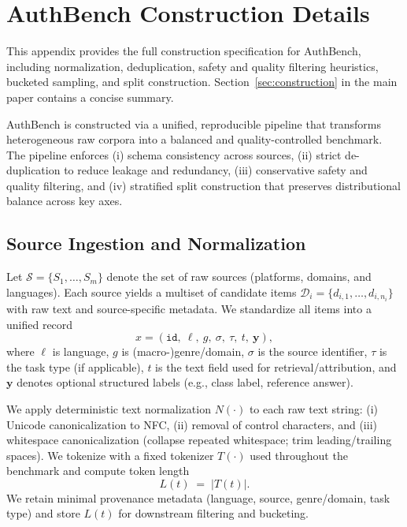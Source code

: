 \documentclass[11pt]{article}
\begin{document}


\appendix

\section{AuthBench Construction Details}
\label{sec:appendix-construction-details}

This appendix provides the full construction specification for AuthBench, including normalization, deduplication, safety and quality filtering heuristics, bucketed sampling, and split construction.
Section~\ref{sec:construction} in the main paper contains a concise summary.

AuthBench is constructed via a unified, reproducible pipeline that transforms heterogeneous raw corpora into a balanced and quality-controlled benchmark. The pipeline enforces (i) schema consistency across sources, (ii) strict de-duplication to reduce leakage and redundancy, (iii) conservative safety and quality filtering, and (iv) stratified split construction that preserves distributional balance across key axes.

\subsection{Source Ingestion and Normalization}
\label{subsec:construct-ingest}
Let $\mathcal{S}=\{S_1,\dots,S_m\}$ denote the set of raw sources (platforms, domains, and languages). Each source yields a multiset of candidate items
$\mathcal{D}_i=\{d_{i,1},\dots,d_{i,n_i}\}$ with raw text and source-specific metadata.
We standardize all items into a unified record
\[
x = (\texttt{id},\ \ell,\ g,\ \sigma,\ \tau,\ t,\ \mathbf{y}),
\]
where $\ell$ is language, $g$ is (macro-)genre/domain, $\sigma$ is the source identifier, $\tau$ is the task type (if applicable), $t$ is the text field used for retrieval/attribution, and $\mathbf{y}$ denotes optional structured labels (e.g., class label, reference answer).

We apply deterministic text normalization $N(\cdot)$ to each raw text string:
(i) Unicode canonicalization to NFC, (ii) removal of control characters, and (iii) whitespace canonicalization (collapse repeated whitespace; trim leading/trailing spaces). We tokenize with a fixed tokenizer $T(\cdot)$ used throughout the benchmark and compute token length
\[
L(t) \;=\; \lvert T(t)\rvert .
\]
We retain minimal provenance metadata (language, source, genre/domain, task type) and store $L(t)$ for downstream filtering and bucketing.
\end{document}
